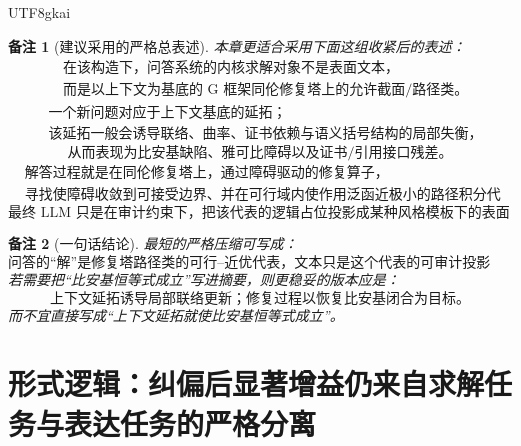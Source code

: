 \documentclass[12pt]{article}
\newtheorem{remark}{备注}[section]
\begin{document}
\begin{CJK*}{UTF8}{gkai}
\begin{remark}[建议采用的严格总表述]
本章更适合采用下面这组收紧后的表述：
\[
  \boxed{
    \begin{aligned}
      &\text{在该构造下，问答系统的内核求解对象不是表面文本，}\\
      &\text{而是以上下文为基底的 G 框架同伦修复塔上的允许截面/路径类。}
    \end{aligned}
  }
\]
\[
  \boxed{
    \begin{aligned}
      &\text{一个新问题对应于上下文基底的延拓；}\\
      &\text{该延拓一般会诱导联络、曲率、证书依赖与语义括号结构的局部失衡，}
    \end{aligned}
  }
\]
\[
  \boxed{
    \text{从而表现为比安基缺陷、雅可比障碍以及证书/引用接口残差。}
  }
\]
\[
  \boxed{
    \begin{aligned}
      &\text{解答过程就是在同伦修复塔上，通过障碍驱动的修复算子，}\\
      &\text{寻找使障碍收敛到可接受边界、并在可行域内使作用泛函近极小的路径积分代表。}
    \end{aligned}
  }
\]
\[
  \boxed{
    \text{最终 LLM 只是在审计约束下，把该代表的逻辑占位投影成某种风格模板下的表面表达。}
  }
\]
\end{remark}

\begin{remark}[一句话结论]
最短的严格压缩可写成：
\[
  \boxed{
    \text{问答的“解”是修复塔路径类的可行--近优代表，文本只是这个代表的可审计投影壳。}
  }
\]
若需要把“比安基恒等式成立”写进摘要，则更稳妥的版本应是：
\[
  \boxed{
    \text{上下文延拓诱导局部联络更新；修复过程以恢复比安基闭合为目标。}
  }
\]
而不宜直接写成“上下文延拓就使比安基恒等式成立”。
\end{remark}

\clearpage

\section{形式逻辑：纠偏后显著增益仍来自求解任务与表达任务的严格分离}
\label{sec:tex37-ch5}


\end{CJK*}
\end{document}
